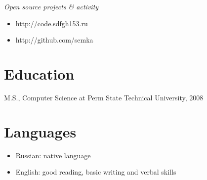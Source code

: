 \documentclass[12pt]{res}
\begin{document}
\begin{resume}
{\sl Open source projects \& activity}
\begin{itemize}
\item http://code.sdfgh153.ru
\item http://github.com/semka
\end{itemize}

\section{Education}
M.S., Computer Science at Perm State Technical University, 2008

\section{Languages}
\begin{itemize}
\item Russian: native language
\item English: good reading, basic writing and verbal skills
\end{itemize}

\end{resume}
\end{document}
